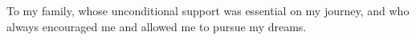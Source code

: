\maketitle

\begin{itadedication}
To my family, whose unconditional support was essential on my journey, and who always encouraged me and allowed me to pursue my dreams. 
\end{itadedication}

\begin{itathanks}

\end{itathanks}

\thispagestyle{empty}
\ifhyperref{}\fi
\begin{flushright}
\begin{spacing}{1}
\mbox{}\vfill

\end{spacing}
\end{flushright}

\begin{abstract}
\noindent

\end{abstract}

\begin{englishabstract}
\noindent

\end{englishabstract}

\listoffigures %

\listoftables %

\listofabbreviations


\tableofcontents
